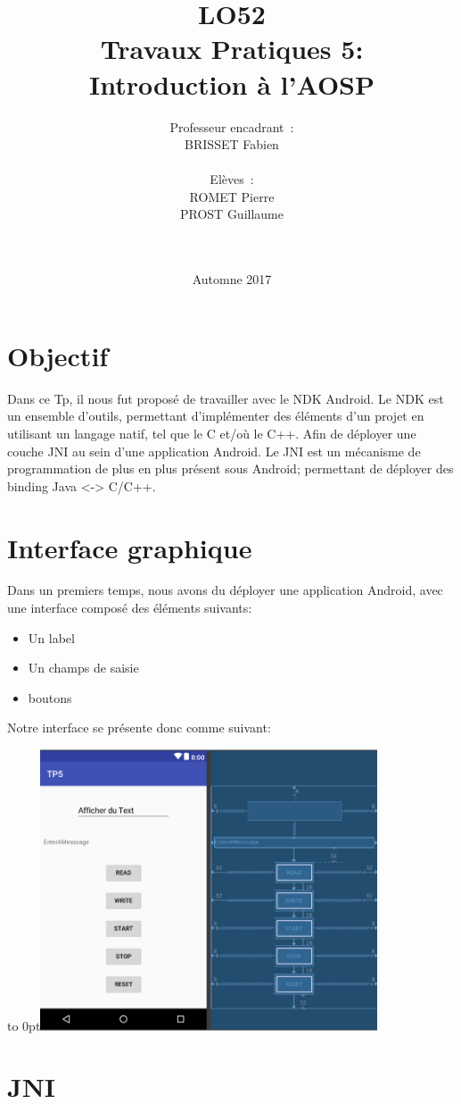 \documentclass[french,a4paper,12pt]{report}
\title{LO52\\ Travaux Pratiques 5:\\ Introduction à l'AOSP}
\author{Professeur encadrant : \\BRISSET Fabien \\ \\ Elèves : \\ROMET Pierre
\\PROST Guillaume \\ \\ \\}
\date{Automne 2017}
\begin{document}
\maketitle
\tableofcontents

\chapter{Objectif}
Dans ce Tp, il nous fut proposé de travailler avec le NDK Android.
Le NDK est un ensemble d'outils, permettant d'implémenter des éléments d'un
projet en utilisant un langage natif, tel que le C et/où le C++.
Afin de déployer une couche JNI au sein d'une application Android.
Le JNI est un mécanisme de programmation de plus en plus présent sous Android;
permettant de déployer des binding Java <-> C/C++.

\chapter{Interface graphique}
Dans un premiers temps, nous avons du déployer une application Android, avec
une interface composé des éléments suivants:
\begin{itemize}
  \item Un label
  \item Un champs de saisie
  \item  boutons
\end{itemize}

Notre interface se présente donc comme suivant:

\hfill\hbox to 0pt{\hss\includegraphics[width=10cm]{1.png}\hss}\hfill\null\newline

\chapter{JNI}
\end{document}
